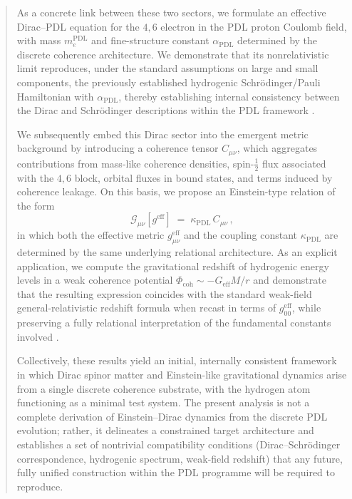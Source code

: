 \documentclass[11pt,a4paper]{article}
\theoremstyle{definition}
\newcommand{\PDL}{\mathrm{PDL}}
\newcommand{\Geff}{G_{\mathrm{eff}}}
\newcommand{\alphaPDL}{\alpha_{\mathrm{PDL}}}
\newcommand{\Ccoh}{C_{\mu\nu}} %
\begin{document}
\begin{abstract}
As a concrete link between these two sectors, we formulate an effective Dirac–PDL equation for the $4,6$ electron in the PDL proton Coulomb field, with mass $m_e^{\PDL}$ and fine-structure constant $\alphaPDL$ determined by the discrete coherence architecture. We demonstrate that its nonrelativistic limit reproduces, under the standard assumptions on large and small components, the previously established hydrogenic Schrödinger/Pauli Hamiltonian with $\alphaPDL$, thereby establishing internal consistency between the Dirac and Schrödinger descriptions within the PDL framework \cite{Schodinger_PDL,Sketch_derivation_Schroedinger_PDL}. 

We subsequently embed this Dirac sector into the emergent metric background by introducing a coherence tensor $\Ccoh$, which aggregates contributions from mass-like coherence densities, spin-$\tfrac{1}{2}$ flux associated with the $4,6$ block, orbital fluxes in bound states, and terms induced by coherence leakage. On this basis, we propose an Einstein-type relation of the form
\[
\mathcal{G}_{\mu\nu}[g^{\mathrm{eff}}] \;=\; \kappa_{\PDL}\,\Ccoh\,,
\]
in which both the effective metric $g^{\mathrm{eff}}_{\mu\nu}$ and the coupling constant $\kappa_{\PDL}$ are determined by the same underlying relational architecture. As an explicit application, we compute the gravitational redshift of hydrogenic energy levels in a weak coherence potential $\Phi_{\mathrm{coh}} \sim -\Geff M/r$ and demonstrate that the resulting expression coincides with the standard weak-field general-relativistic redshift formula when recast in terms of $g^{\mathrm{eff}}_{00}$, while preserving a fully relational interpretation of the fundamental constants involved \cite{A_Topological_Reformulation_in_the_Projective_Dynamic_Logo_Framework_Hierarchical_Coherence_Filtering_and_the_Exponent_18_in_PDL,zenodo18462686}. 

Collectively, these results yield an initial, internally consistent framework in which Dirac spinor matter and Einstein-like gravitational dynamics arise from a single discrete coherence substrate, with the hydrogen atom functioning as a minimal test system. The present analysis is not a complete derivation of Einstein–Dirac dynamics from the discrete PDL evolution; rather, it delineates a constrained target architecture and establishes a set of nontrivial compatibility conditions (Dirac–Schrödinger correspondence, hydrogenic spectrum, weak-field redshift) that any future, fully unified construction within the PDL programme will be required to reproduce.
\end{abstract}
\end{document}
